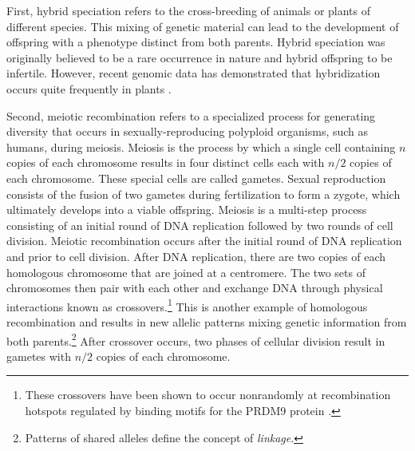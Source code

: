 First, hybrid speciation refers to the cross-breeding of animals or plants of different species.
This mixing of genetic material can lead to the development of offspring with a phenotype distinct from both parents.
Hybrid speciation was originally believed to be a rare occurrence in nature and hybrid offspring to be infertile.
However, recent genomic data has demonstrated that hybridization occurs quite frequently in plants \cite{Arnold:1996,Arnold:2007vq}.

Second, meiotic recombination refers to a specialized process for generating diversity that occurs in sexually-reproducing polyploid organisms, such as humans, during meiosis.
Meiosis is the process by which a single cell containing $n$ copies of each chromosome results in four distinct cells each with $n/2$ copies of each chromosome.
These special cells are called gametes.
Sexual reproduction consists of the fusion of two gametes during fertilization to form a zygote, which ultimately develops into a viable offspring.
Meiosis is a multi-step process consisting of an initial round of DNA replication followed by two rounds of cell division.
Meiotic recombination occurs after the initial round of DNA replication and prior to cell division.
After DNA replication, there are two copies of each homologous chromosome that are joined at a centromere.
The two sets of chromosomes then pair with each other and exchange DNA through physical interactions known as crossovers.\footnote{These crossovers have been shown to occur nonrandomly at recombination hotspots regulated by binding motifs for the PRDM9 protein \cite{Baudat:2010ii,Camara:2016}.}
This is another example of homologous recombination and results in new allelic patterns mixing genetic information from both parents.\footnote{Patterns of shared alleles define the concept of \emph{linkage}.}
After crossover occurs, two phases of cellular division result in gametes with $n/2$ copies of each chromosome.


